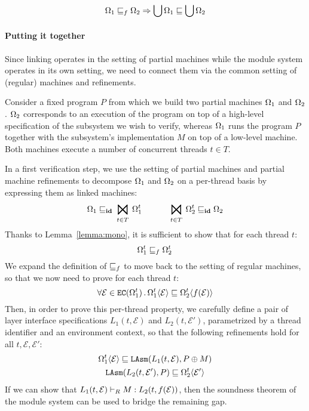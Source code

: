 \begin{lemma}
\[ \Omega_1 \sqsubseteq_f \Omega_2 \Rightarrow \bigcup \Omega_1 \sqsubseteq \bigcup \Omega_2 \]
\end{lemma}

\paragraph{Putting it together}
Since linking operates in the setting of partial machines
while the module system operates in its own setting,
we need to connect them
via the common setting of (regular) machines and refinements.

Consider a fixed program $P$
from which we build two partial machines $\Omega_1$ and $\Omega_2$.
$\Omega_2$ corresponds to an execution of the program
on top of a high-level specification of the subsystem
we wish to verify,
whereas $\Omega_1$ runs the program $P$ together with the subsystem's implementation $M$
on top of a low-level machine.
Both machines execute a number of concurrent threads $t \in T$.

In a first verification step,
we use the setting of partial machines and partial machine refinements to 
decompose $\Omega_1$ and $\Omega_2$ on a per-thread basis
by expressing them as linked machines:
\[
	\Mach_1 \refines_\id \bigJoin_{t \in T} \Mach_1^t  \hspace{3em}
	\bigJoin_{t \in T} \Mach_2^t \refines_\id \Mach_2
\]
Thanks to Lemma~\ref{lemma:mono},
it is sufficient to show that for each thread $t$:
\[
		\Omega_1^t \sqsubseteq_f \Omega_2^t \,
\]
We expand the definition of $\sqsubseteq_f$
to move back to the setting of regular machines,
so that we now need to prove for each thread $t$:
\[
	\forall \mathcal{E} \in {{{\texttt{EC}}}({\Omega_1^t})}\,.\,
		\Omega_1^t \langle \mathcal{E} \rangle \sqsubseteq
		\Omega_2^t \langle f(\mathcal{E}) \rangle
\]
Then, in order to prove this per-thread property,
we carefully define a pair of layer interface specifications
$L_1(t, \mathcal{E})$ and $L_2(t, \mathcal{E}')$,
parametrized by a thread identifier and an environment context,
so that the following refinements hold for all $t, \mathcal{E}, \mathcal{E}'$:
\begin{gather*}
	\Omega_1^t \langle \mathcal{E} \rangle \sqsubseteq {{\texttt{LAsm}}}(L_1(t, \mathcal{E}), P \oplus M) \\
	{{\texttt{LAsm}}}(L_2(t, \mathcal{E}'), P) \sqsubseteq \Omega_2^t \langle \mathcal{E}' \rangle
\end{gather*}
If we can show that
$ L_1(t, \mathcal{E}) \vdash_{R} M : L_2(t, f(\mathcal{E})) $,
then the soundness theorem of the module system
can be used to bridge the remaining gap.


